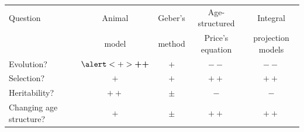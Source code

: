 \documentclass[10pt]{beamer}%
\begin{document}
\begin{frame}

\begin{center}
\begin{tabular}{p{2cm}|c c c c}
\hline
Question & Animal & Geber's & Age-structured & Integral\\
				& model		& method	& Price's equation & projection models \\
\hline
Evolution? & $\alert<+>{\boldsymbol{++}}$ & $+$ & $--$ & $--$ \\

Selection? & $+$ & $+$ & $++$ & $++$ \\

Heritability? & $++$ & $\pm$ & $-$ & $-$ \\

Changing age structure? & $+$ & $\pm$ & $++$ & $++$ \\
\end{tabular}
\end{center}

\end{frame}
\end{document}
